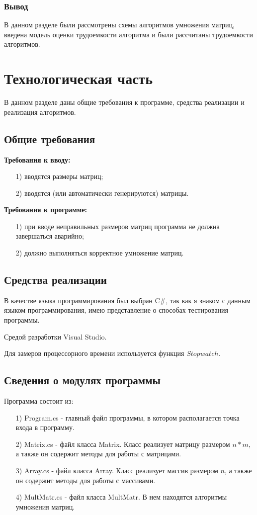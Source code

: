 \documentclass[12pt]{report}
\begin{document}
	\subsection{Вывод}
	В данном разделе были рассмотрены схемы алгоритмов умножения матриц, введена модель оценки трудоемкости алгоритма и были рассчитаны трудоемкости алгоритмов.
	
	\chapter{Технологическая часть}
	В данном разделе даны общие требования к программе, средства реализации и реализация алгоритмов.
	\section{Общие требования}
	\textbf{Требования к вводу:}
	\begin{enumerate}
		\item[1)] вводятся размеры матриц;
		\item[2)] вводятся (или автоматически генерируются) матрицы.
	\end{enumerate}
	\noindent\textbf{Требования к программе:}
	\begin{enumerate}
		\item[1)] при вводе неправильных размеров матриц программа не должна завершаться аварийно;
		\item[2)] должно выполняться корректное умножение матриц.
	\end{enumerate}
	
	\section{Средства реализации}
	В качестве языка программирования был выбран C\#, так как я знаком с данным языком программирования, имею представление о способах тестирования программы.\par
	Средой разработки Visual Studio.\par 
	Для замеров процессорного времени используется функция $Stopwatch$.
	
	\section{Сведения о модулях программы}
	Программа состоит из:
	\begin{enumerate}
		\item[1)] Program.cs - главный файл программы, в котором располагается точка входа в программу.
		\item[2)] Matrix.cs - файл класса Matrix. Класс реализует матрицу размером $n*m$, а также он содержит методы для работы с матрицами.
		\item[3)] Array.cs - файл класса Array. Класс реализует массив размером $n$, а также он содержит методы для работы с массивами.
		\item[4)] MultMatr.cs - файл класса MultMatr. В нем находятся алгоритмы умножения матриц.
	\end{enumerate}
	
\end{document}
